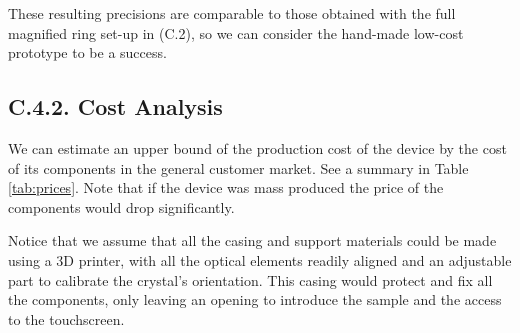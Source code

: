 \documentclass[11pt, a4paper, twoside]{article} %
\begin{document}
These resulting precisions are comparable to those obtained with the full magnified ring set-up in (C.2), so we can consider the hand-made low-cost prototype to be a success.\vspace{-0.1cm}

\subsection*{C.4.2. Cost Analysis\vspace{-0.1cm}}
We can estimate an upper bound of the production cost of the device by the cost of its components in the general customer market. See a summary in Table \ref{tab:prices}. Note that if the device was mass produced the price of the components would drop significantly. 


Notice that we assume that all the casing and support materials could be made using a 3D printer, with all the optical elements readily aligned and an adjustable part to calibrate the crystal's orientation. This casing would protect and fix all the components, only leaving an opening to introduce the sample and the access to the touchscreen.
\end{document}
